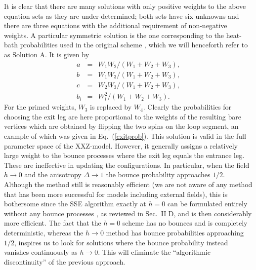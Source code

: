 \documentclass[10pt,pre,aps,twocolumn,showpacs,superscriptaddress,
floatfix]{revtex4}
\newcommand{\bea}{\begin{eqnarray}}
\newcommand{\eea}{\end{eqnarray}}
\begin{document}
It is clear that there are many solutions with only positive weights to the 
above equation sets as they are under-determined; both sets have six 
unknowns and there are three equations with the additional requirement of 
non-negative weights. A particular symmetric solution is the one corresponding
to the heat-bath probabilities used in the original scheme \cite{sse3}, 
which we will henceforth refer to as Solution A. It is given by
\bea
	a   & = & W_1 W_2/(W_1 + W_2 + W_3), \nonumber  \\
	b   & = & W_1 W_3/(W_1 + W_2 + W_3), \nonumber \\
	c   & = & W_2 W_3/(W_1 + W_2 + W_3), \label{symmetricsol} \\
	b_i & = & W_i^2/(W_1 + W_2 + W_3). \nonumber
\eea
For the primed weights, $W_3$ is replaced by $W_4$. Clearly the probabilities 
for choosing the exit leg are here proportional to the weights of the resulting
bare vertices which are obtained by flipping the two spins on the loop 
segment, an example of which was given in Eq.~(\ref{exitprob}).
This solution is valid in the full parameter space of the XXZ-model. 
However, it generally assigns a relatively large weight to the bounce 
processes where the exit leg equals the entrance leg. These are ineffective 
in updating the configurations. In particular, when the field $h\to 0$
and the anisotropy $\Delta \to 1$ the bounce probability approaches $1/2$. 
Although the method still is reasonably efficient (we are not aware of any 
method that has been more successful for models including external fields), 
this is bothersome since the SSE algorithm exactly at $h=0$ can be formulated 
entirely without any bounce processes \cite{sse3}, as reviewed in Sec.~II D,
and is then considerably more efficient. The fact that the $h=0$ scheme has 
no bounces and is completely deterministic, whereas the $h \to 0$ method has 
bounce probabilities approaching $1/2$, inspires us to look for solutions 
where the bounce probability instead vanishes continuously as $h \to 0$. 
This will eliminate the ``algorithmic discontinuity'' of the previous approach.
\end{document}
